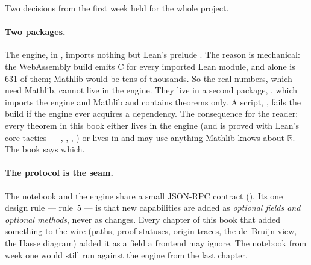 \begin{center}
\end{center}

Two decisions from the first week held for the whole project.

\paragraph{Two packages.} The engine, in , imports nothing but Lean's prelude
. The reason is mechanical: the WebAssembly build emits C for every imported Lean module,
and  alone is 631 of them; Mathlib would be tens of thousands. So the real numbers,
which need Mathlib, cannot live in the engine. They live in a second package, ,
which imports the engine and Mathlib and contains theorems only. A script,
, fails the build if the engine ever acquires a dependency.
The consequence for the reader: every theorem in this book either lives in the engine (and is
proved with Lean's core tactics --- , , , ) or lives in
 and may use anything Mathlib knows about $\mathbb{R}$. The book says which.

\paragraph{The protocol is the seam.} The notebook and the engine share a small JSON-RPC contract
(). Its one design rule --- rule~5 --- is that new capabilities are added
as \emph{optional fields and optional methods}, never as changes. Every chapter of this book that
added something to the wire (paths, proof statuses, origin traces, the de~Bruijn view, the Hasse
diagram) added it as a field a frontend may ignore. The notebook from week one would still run
against the engine from the last chapter.

